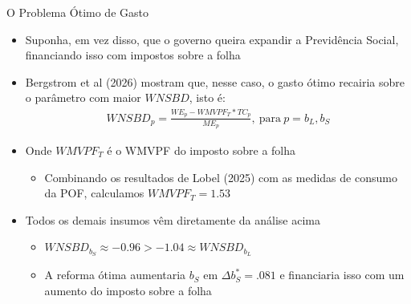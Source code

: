 \begin{frame}[label=expenditure]{O Problema Ótimo de Gasto}
    \begin{itemize}
        \item Suponha, em vez disso, que o governo queira expandir a Previdência Social, financiando isso com impostos sobre a folha
        \item Bergstrom et al (2026) mostram que, nesse caso, o gasto ótimo recairia sobre o parâmetro com maior $WNSBD$, isto é:
        {\scriptsize
        \begin{align*}
            WNSBD_p= \frac{WE_p-WMVPF_T*TC_p}{ME_p}, \ \text{para} \ p=b_L,b_S
        \end{align*}}
        \item Onde $WMVPF_T$ é o WMVPF do imposto sobre a folha
        \begin{itemize}
            \item Combinando os resultados de Lobel (2025) com as medidas de consumo da POF, calculamos $WMVPF_T = 1.53$
        \end{itemize}
        \item Todos os demais insumos vêm diretamente da análise acima
        \begin{itemize}
            \item $WNSBD_{b_S}\approx -0.96>-1.04\approx WNSBD_{b_L}$
            \item A reforma ótima aumentaria $b_S$ em $\Delta b_S^*=.081$ e financiaria isso com um aumento do imposto sobre a folha
        \end{itemize}
    \end{itemize}
\end{frame}

